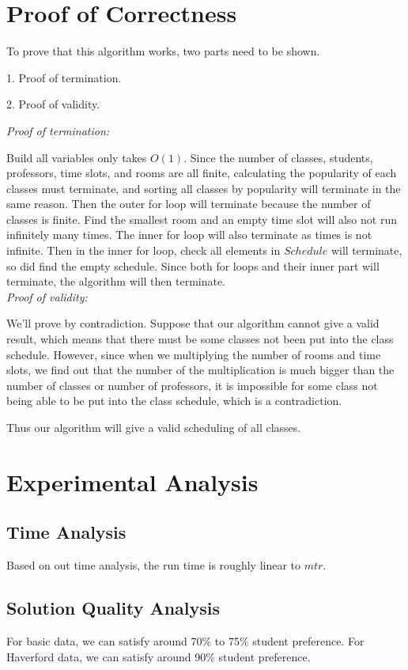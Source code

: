 \documentclass[11pt, oneside]{article}   	%
\begin{document}
\section{Proof of Correctness}
To prove that this algorithm works, two parts need to be shown.

1. Proof of termination.

2. Proof of validity.

\textit{Proof of termination:}

Build all variables only takes $O(1)$. Since the number of classes, students, professors, time slots, and rooms are all finite, calculating the popularity of each classes must terminate, and sorting all classes by popularity will terminate in the same reason. Then the outer for loop will terminate because the number of classes is finite. Find the smallest room and an empty time slot will also not run infinitely many times. The inner for loop will also terminate as times is not infinite. Then in the inner for loop, check all elements in $Schedule$ will terminate, so did find the empty schedule. Since both for loops and their inner part will terminate, the algorithm will then terminate. \\

\textit{Proof of validity:}

We'll prove by contradiction. Suppose that our algorithm cannot give a valid result, which means that there must be some classes not been put into the class schedule. However, since when we multiplying the number of rooms and time slots, we find out that the number of the multiplication is much bigger than the number of classes or number of professors, it is impossible for some class not being able to be put into the class schedule, which is a contradiction.

Thus our algorithm will give a valid scheduling of all classes.


\newpage
\section{Experimental Analysis}
\subsection{Time Analysis}
Based on out time analysis, the run time is roughly linear to $mtr$.

\subsection{Solution Quality Analysis}
For basic data, we can satisfy around 70\% to 75\% student preference. For Haverford data, we can satisfy around 90\% student preference. %
\end{document}
